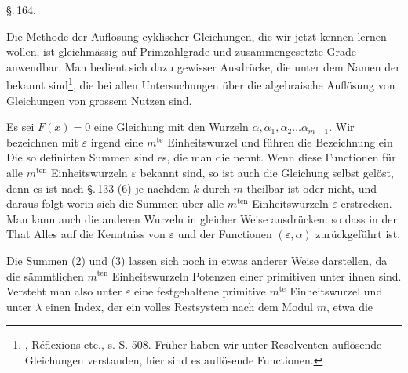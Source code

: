 
\begin{center}
\S.\,164.\\
\end{center}

Die Methode der Auflösung cyklischer Gleichungen, die wir jetzt kennen lernen wollen, ist gleichmässig auf Primzahlgrade und zusammengesetzte Grade anwendbar. Man bedient sich dazu gewisser Ausdrücke, die unter dem Namen der  bekannt sind\footnote{, Réflexions etc., s. S. 508. Früher haben wir unter Resolventen auflösende Gleichungen verstanden, hier sind es auflösende Functionen.}, die bei allen Untersuchungen über die algebraische Auflösung von Gleichungen von grossem Nutzen sind.

Es sei $F(x) = 0$ eine Gleichung mit den Wurzeln $\alpha, \alpha_1, \alpha_2 \ldots \alpha_{m-1}$. Wir bezeichnen mit $\varepsilon$ irgend eine $m^{\text{te}}$ Einheitswurzel und führen die Bezeichnung ein
Die so definirten Summen sind es, die man die  nennt. Wenn diese Functionen für alle $m^{\text{ten}}$ Einheitswurzeln $\varepsilon$ bekannt sind, so ist auch die Gleichung selbst gelöst, denn es ist nach \S.\,133 (6)
je nachdem $k$ durch $m$ theilbar ist oder nicht, und daraus folgt
worin sich die Summen über alle $m^{\text{ten}}$ Einheitswurzeln $\varepsilon$ erstrecken. Man kann auch die anderen Wurzeln in gleicher Weise ausdrücken:
so dass in der That Alles auf die Kenntniss von $\varepsilon$ und der Functionen $(\varepsilon, \alpha)$ zurückgeführt ist.

Die Summen (2) und (3) lassen sich noch in etwas anderer Weise darstellen, da die sämmtlichen $m^{\text{ten}}$ Einheitswurzeln Potenzen einer primitiven unter ihnen sind. Versteht man also unter $\varepsilon$ eine festgehaltene primitive $m^{\text{te}}$ Einheitswurzel und unter $\lambda$ einen Index, der ein volles Restsystem nach dem Modul $m$, etwa die
